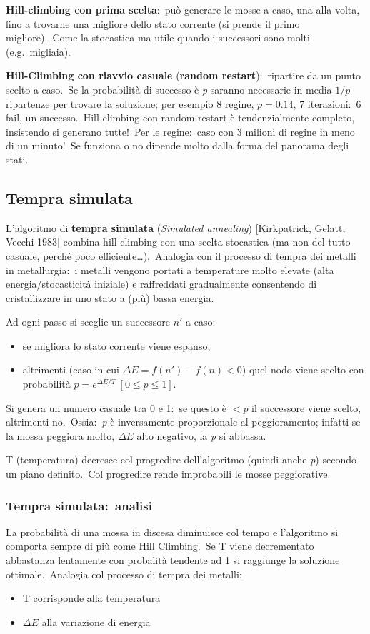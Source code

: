 \textbf{Hill-climbing con prima scelta}:\ può generare le mosse a caso, una alla volta, fino a trovarne una migliore dello stato corrente (si prende il primo migliore).\
Come la stocastica ma utile quando i successori sono molti (e.g.\ migliaia).

\textbf{Hill-Climbing con riavvio casuale} (\textbf{random restart}):\ ripartire da un punto scelto a caso.\
Se la probabilità di successo è \textit{p} saranno necessarie in media $1/p$ ripartenze per trovare la soluzione; per esempio 8 regine, $p=0.14$, 7 iterazioni:\ 6 fail, un successo.\
Hill-climbing con random-restart è tendenzialmente completo, insistendo si generano tutte!\
Per le regine:\ caso con 3 milioni di regine in meno di un minuto!\
Se funziona o no dipende molto dalla forma del panorama degli stati.\

\subsection{Tempra simulata}

L'algoritmo di \textbf{tempra simulata} (\textit{Simulated annealing}) [Kirkpatrick, Gelatt, Vecchi 1983] combina hill-climbing con una scelta stocastica (ma non del tutto casuale, perché poco efficiente\dots).\
Analogia con il processo di tempra dei metalli in metallurgia:\ i metalli vengono portati a temperature molto elevate (alta energia/stocasticità iniziale) e raffreddati gradualmente consentendo di cristallizzare in uno stato a (più) bassa energia.\

\noindent Ad ogni passo si sceglie un successore $n'$ a caso:
\begin{itemize}
	\item se migliora lo stato corrente viene espanso,
	\item altrimenti (caso in cui $\Delta E=f(n')-f(n) < 0$) quel nodo viene scelto con probabilità $p=e^{\Delta E/T}\ [0 \leq p \leq 1]$.
\end{itemize}
Si genera un numero casuale tra 0 e 1:\ se questo è $< p$ il successore viene scelto, altrimenti no.\
Ossia:\ \textit{p} è inversamente proporzionale al peggioramento; infatti se la mossa peggiora molto, $\Delta E$ alto negativo, la \textit{p} si abbassa.

T (temperatura) decresce col progredire dell'algoritmo (quindi anche \textit{p}) secondo un piano definito.\
Col progredire rende improbabili le mosse peggiorative.

\subsubsection{Tempra simulata:\ analisi}
La probabilità di una mossa in discesa diminuisce col tempo e l'algoritmo si comporta sempre di più come Hill Climbing.\
Se T viene decrementato abbastanza lentamente con probalità tendente ad 1 si raggiunge la soluzione ottimale.\
Analogia col processo di tempra dei metalli:
\begin{itemize}
	\item T corrisponde alla temperatura
	\item $\Delta E$ alla variazione di energia
\end{itemize}

